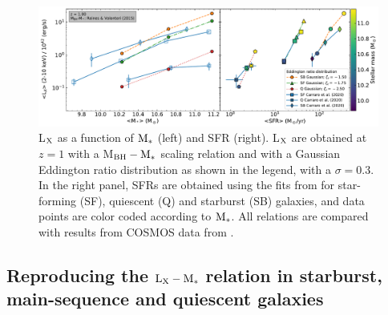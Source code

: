 

\begin{figure}
\begin{center}
\includegraphics[width=\textwidth]{Figs/Chapter3/fig4.pdf} 
  \caption{L$_{\rm X}$ as a function of ${\rm M}_*$ (left) and SFR (right). L$_{\rm X}$ are obtained at $z=1$ with a \citet{2015ApJ...813...82R} M$_{\rm BH}-{\rm M}_*$ scaling relation and with a Gaussian Eddington ratio distribution as shown in the legend, with a $\sigma=0.3$. In the right panel, SFRs are obtained using the fits from \citet{2020A&A...642A..65C} for star-forming (SF), quiescent (Q) and starburst (SB) galaxies, and data points are color coded according to ${\rm M}_*$. All relations are compared with results from COSMOS data from \citet{2020A&A...642A..65C}.}
    \label{fig:SFQSB}
\end{center}
\end{figure}

\subsection{Reproducing the ${\rm L}_{\rm X}-{\rm M}_*$ relation in starburst, main-sequence and quiescent galaxies} \label{subsec:SFQSB}

